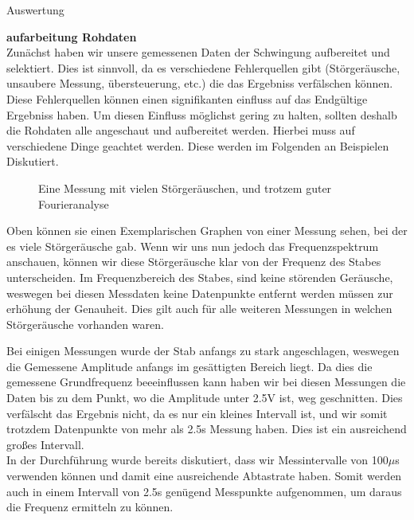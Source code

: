 \documentclass[twoside]{protokoll}
\begin{document}
\begin{aufgabe}{Auswertung}

\textbf{aufarbeitung Rohdaten}\\

    
    Zunächst haben wir unsere gemessenen Daten der Schwingung aufbereitet und selektiert.
    Dies ist sinnvoll, da es verschiedene Fehlerquellen gibt (Störgeräusche, unsaubere Messung, übersteuerung, etc.) die das Ergebniss verfälschen können.
    Diese Fehlerquellen können einen signifikanten einfluss auf das Endgültige Ergebniss haben.
    Um diesen Einfluss möglichst gering zu halten, sollten deshalb die Rohdaten alle angeschaut und aufbereitet werden.
    Hierbei muss auf verschiedene Dinge geachtet werden.
    Diese werden im Folgenden an Beispielen Diskutiert. 

\begin{figure}[H]
    \caption{Eine Messung mit vielen Störgeräuschen, und trotzem guter Fourieranalyse}
  \centering
\end{figure}
 
Oben können sie einen Exemplarischen Graphen von einer Messung sehen, bei der es viele Störgeräusche gab.
Wenn wir uns nun jedoch das Frequenzspektrum anschauen, können wir diese Störgeräusche klar von der Frequenz des Stabes unterscheiden.
Im Frequenzbereich des Stabes, sind keine störenden Geräusche, weswegen bei diesen Messdaten keine Datenpunkte entfernt werden müssen zur erhöhung der Genauheit.
Dies gilt auch für alle weiteren Messungen in welchen Störgeräusche vorhanden waren. 

Bei einigen Messungen wurde der Stab anfangs zu stark angeschlagen, weswegen die Gemessene Amplitude anfangs im gesättigten Bereich liegt.
Da dies die gemessene Grundfrequenz beeeinflussen kann  haben wir bei diesen Messungen die Daten bis zu dem Punkt, wo die Amplitude unter 2.5V ist, weg geschnitten.
Dies verfälscht das Ergebnis nicht, da es nur ein kleines Intervall ist, und wir somit trotzdem Datenpunkte von mehr als 2.5s Messung haben.
Dies ist ein ausreichend großes Intervall.\\
In der Durchführung wurde bereits diskutiert, dass wir Messintervalle von 100$\mu$s verwenden können und damit eine ausreichende Abtastrate haben.
Somit werden auch in einem Intervall von 2.5s  genügend Messpunkte aufgenommen, um daraus die Frequenz ermitteln zu können.


\end{aufgabe}
\end{document}
